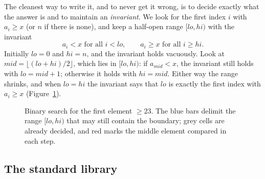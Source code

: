 The cleanest way to write it, and to never get it wrong, is to decide exactly what the answer is and to maintain an
\emph{invariant}. We look for the first index $i$ with $a_i \ge x$ (or $n$ if there is none), and keep a half-open range
$[lo, hi)$ with the invariant
\[
  a_i < x \text{ for all } i < lo, \qquad a_i \ge x \text{ for all } i \ge hi .
\]
Initially $lo = 0$ and $hi = n$, and the invariant holds vacuously. Look at $mid = \lfloor (lo + hi)/2 \rfloor$, which lies in
$[lo, hi)$: if $a_{mid} < x$, the invariant still holds with $lo = mid + 1$; otherwise it holds with $hi = mid$. Either way the
range shrinks, and when $lo = hi$ the invariant says that $lo$ is exactly the first index with $a_i \ge x$
(Figure~\ref{fig:bsearch-steps}).

\begin{figure}[htbp]
\centering
{}
\caption{Binary search for the first element $\ge 23$. The blue bars delimit the range $[lo, hi)$ that may still contain the
boundary; grey cells are already decided, and red marks the middle element compared in each step.}
\label{fig:bsearch-steps}
\end{figure}

\subsection{The standard library}

